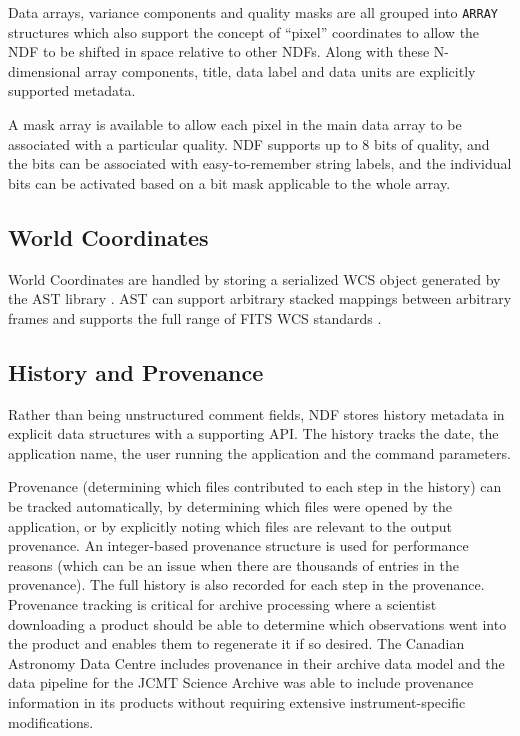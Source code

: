 \documentclass[11pt,twoside]{article}
\begin{document}
Data arrays, variance components and quality masks are all grouped
into \texttt{ARRAY} structures which also support the concept of
``pixel'' coordinates to allow the NDF to be shifted in space relative
to other NDFs. Along with these N-dimensional array components, title,
data label and data units are explicitly supported metadata.

A mask array is available to allow each pixel in the main data array
to be associated with a particular quality. NDF supports up to 8 bits
of quality, and the bits can be associated with easy-to-remember
string labels, and the individual bits can be activated based on a bit
mask applicable to the whole array.

\subsection{World Coordinates}

World Coordinates are handled by storing a serialized WCS object
generated by the AST library \citep{1998ASPC..145...41W}. AST can
support arbitrary stacked mappings between arbitrary frames and
supports the full range of FITS WCS standards \citep[see
e.g.][]{2012ASPC..461..825B}.

\subsection{History and Provenance}

Rather than being unstructured comment fields, NDF stores history
metadata in explicit data structures with a supporting API. The
history tracks the date, the application name, the user running the
application and the command parameters.

Provenance (determining which files contributed to each step in the
history) can be tracked automatically, by determining which files were
opened by the application, or by explicitly noting which files are
relevant to the output provenance. An integer-based provenance
structure is used for performance reasons (which can be an issue when
there are thousands of entries in the provenance). The full history is
also recorded for each step in the provenance. Provenance tracking is
critical for archive processing where a scientist downloading a
product should be able to determine which observations went into the
product and enables them to regenerate it if so desired. The Canadian
Astronomy Data Centre includes provenance in their archive data model
\citep[CAOM;][]{P25_adassxxii} and the data pipeline for the JCMT
Science Archive \citep{2008ASPC..394..565J} was able to include
provenance information in its products without requiring extensive
instrument-specific modifications.
\end{document}
